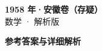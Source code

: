 \documentclass[zihao=-4, a4paper]{ctexart}
\begin{document}
\begin{center}
  {\Large\bfseries 1958 年·安徽卷（存疑）}\\[4pt]
  {\large 数学 · 解析版}
\end{center}
\medskip
{}

\clearpage
{}
\begin{center}{\Large\bfseries 参考答案与详细解析}\end{center}
\medskip

\end{document}
